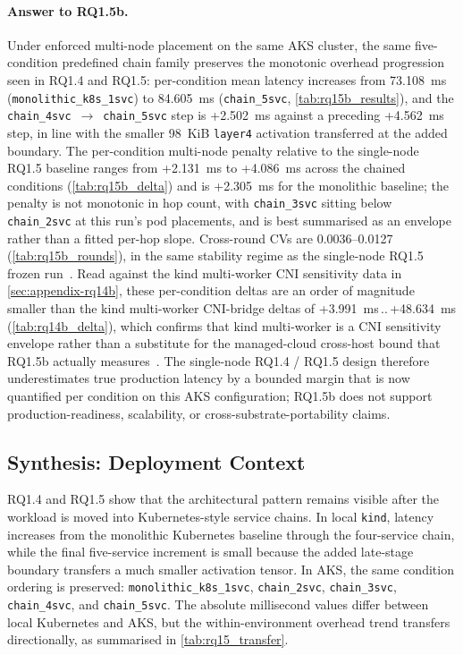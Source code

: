 \paragraph{Answer to RQ1.5b.}
Under enforced multi-node placement on the same AKS cluster, the same
five-condition predefined chain family preserves the monotonic overhead
progression seen in RQ1.4 and RQ1.5: per-condition mean latency
increases from 73.108~ms (\texttt{monolithic\_k8s\_1svc}) to 84.605~ms
(\texttt{chain\_5svc}, \cref{tab:rq15b_results}), and the
\texttt{chain\_4svc}~$\rightarrow$~\texttt{chain\_5svc} step is
+2.502~ms against a preceding +4.562~ms step, in line with the smaller
98~KiB \texttt{layer4} activation transferred at the added boundary.
The per-condition multi-node penalty relative to the single-node RQ1.5
baseline ranges from +2.131~ms to +4.086~ms across the chained
conditions (\cref{tab:rq15b_delta}) and is +2.305~ms for the monolithic
baseline; the penalty is not monotonic in hop count, with
\texttt{chain\_3svc} sitting below \texttt{chain\_2svc} at this run's
pod placements, and is best summarised as an envelope rather than a
fitted per-hop slope. Cross-round CVs are 0.0036--0.0127
(\cref{tab:rq15b_rounds}), in the same stability regime as the
single-node RQ1.5 frozen run~\cite{benchmarking_sc15}. Read against the
kind multi-worker CNI sensitivity data in \cref{sec:appendix-rq14b},
these per-condition deltas are an order of magnitude smaller than the
kind multi-worker CNI-bridge deltas of +3.991~ms\,..\,+48.634~ms
(\cref{tab:rq14b_delta}), which confirms that kind multi-worker is a
CNI sensitivity envelope rather than a substitute for the managed-cloud
cross-host bound that RQ1.5b actually
measures~\cite{cni_k8s_ic2e21,virtualization_costs}. The single-node
RQ1.4 / RQ1.5 design therefore underestimates true production latency
by a bounded margin that is now quantified per condition on this AKS
configuration; RQ1.5b does not support production-readiness,
scalability, or cross-substrate-portability claims.

\subsection{Synthesis: Deployment Context}
\label{sec:analysis-deployment-synthesis}

RQ1.4 and RQ1.5 show that the architectural pattern remains visible after the
workload is moved into Kubernetes-style service chains. In local
\texttt{kind}, latency increases from the monolithic Kubernetes baseline
through the four-service chain, while the final five-service increment is
small because the added late-stage boundary transfers a much smaller
activation tensor. In AKS, the same condition ordering is preserved:
\texttt{monolithic\_k8s\_1svc}, \texttt{chain\_2svc}, \texttt{chain\_3svc},
\texttt{chain\_4svc}, and \texttt{chain\_5svc}. The absolute millisecond
values differ between local Kubernetes and AKS, but the within-environment
overhead trend transfers directionally, as summarised in
\cref{tab:rq15_transfer}.


